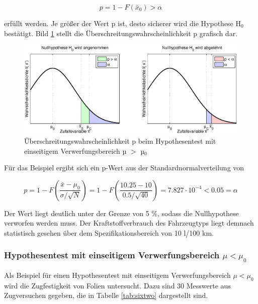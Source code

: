 \begin{equation}\label{eq:sixtwentyone}
p=1-F(\bar{x}_{0})>\alpha
\end{equation}

\noindent erf\"{u}llt werden. Je gr\"{o}{\ss}er der Wert p ist, desto sicherer wird die Hypothese H$_{0}$ best\"{a}tigt. Bild \ref{fig:HypothesentestRechterVerwerfungsbereichPvalue} stellt die \"{U}berschreitungswahrscheinlichkeit p grafisch dar. 

\noindent 
\begin{figure}[H]
  \centerline{\includegraphics[width=1\textwidth]{Kapitel6/Bilder/image4}}
  \caption{\"{U}berschreitungswahrscheinlichkeit p beim Hypothesentest mit einseitigem Verwerfungsbereich µ $\mathrm{>}$ µ$_{0}$}
  \label{fig:HypothesentestRechterVerwerfungsbereichPvalue}
\end{figure}

\noindent F\"{u}r das Beispiel ergibt sich ein p-Wert aus der Standardnormalverteilung von

\begin{equation}\label{eq:sixtwentytwo}
p=1-F\left(\dfrac{\bar{x}-\mu _{0}}{\sigma /\sqrt{N}} \right)=1-F\left(\dfrac{10.25-10}{0.5/\sqrt{40} } \right)= 7.827\cdot 10^{-4} <0.05 = \alpha
\end{equation}

\noindent Der Wert liegt deutlich unter der Grenze von 5 \%, sodass die Nullhypothese verworfen werden muss. Der Kraftstoffverbrauch des Fahrzeugtyps liegt demnach statistisch gesehen \"{u}ber dem Spezifikationsbereich von 10 l/100 km.  

\subsubsection{Hypothesentest mit einseitigem Verwerfungsbereich \texorpdfstring{$\mu < \mu_{0}$}{Lg}}

\noindent Als Beispiel f\"{u}r einen Hypothesentest mit einseitigem Verwerfungsbereich $\mu < \mu_{0}$ wird die Zugfestigkeit von Folien untersucht. Dazu sind 30 Messwerte aus Zugversuchen gegeben, die in Tabelle \ref{tab:sixtwo} dargestellt sind.

